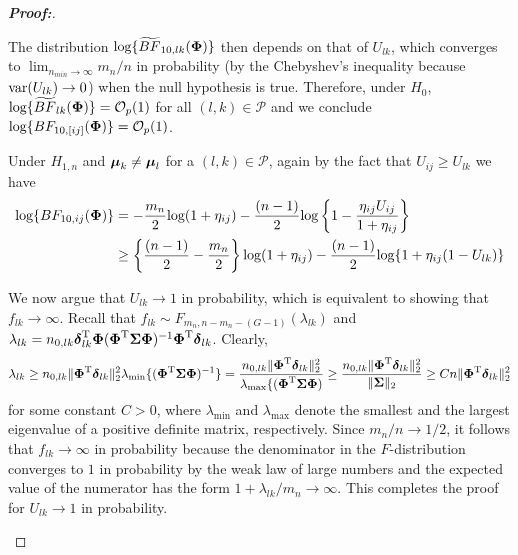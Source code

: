 \documentclass[pdflatex,sn-basic]{sn-jnl}%
\def\log{\hbox{log}}
\def\var{\hbox{var}}
\def\log{\hbox{log}}
\def\var{\hbox{var}}
\def\be{\begin{eqnarray}}
\def\ee{\end{eqnarray}}
\def\trans{^{\rm T}}
\newcommand{\bSigma}{\mbox{\boldmath $\Sigma$}}
\newcommand{\udelta}            {\mbox{\boldmath$\delta$}}
\newcommand{\umu}               {\mbox{\boldmath$\mu$}}
\newcommand{\uPhi}              {\mbox{\boldmath$\Phi$}}
\theoremstyle{thmstyleone}%
\theoremstyle{thmstyletwo}%
\theoremstyle{thmstylethree}%
\begin{document}
\begin{appendices}
\begin{proof}[\textbf{\upshape Proof:}]
\begin{description}
The distribution $ \log\{\widetilde{BF}_{10, lk}(\uPhi) \}$ then depends on that of $U_{lk}$, which
converges to $\lim_{n_{min}\to\infty}m_n/n$ in probability (by the Chebyshev's inequality because $\var(U_{lk})\to 0$)
when the null hypothesis is true.
Therefore, under $H_0$, $\log\{\widetilde{BF}_{lk}(\uPhi) \} = \mathcal{O}_{p}(1)$ for all $(l, k)\in\mathcal{P}$ and we conclude $\log\{BF_{10,[ij]}(\uPhi) \} = \mathcal{O}_{p}(1)$.

Under $H_{1,n}$ and $\umu_{k} \neq \umu_{l}$ for a $(l, k) \in \mathcal{P}$, again 
by the fact that $U_{ij}\geq U_{lk}$ 
we have
\begin{align*}
    \log\{BF_{10,ij}(\uPhi) \} &= -\frac{m_n}{2}\log(1 + \eta_{ij}) - \frac{(n-1)}{2}\log\left\{ 1 - \frac{\eta_{ij} U_{ij}}{1 + \eta_{ij}} \right\}\\
    & \geq \left\{\frac{(n - 1)}{2} - \frac{m_n}{2}\right\}\log(1 + \eta_{ij}) - \frac{(n - 1)}{2}\log\{1 + \eta_{ij}(1 - U_{lk})\}
\end{align*}
{\color{black}
We now argue that $U_{lk}\to 1$ in probability, which is equivalent to showing that $f_{lk}\to\infty$. Recall that $f_{lk}\sim F_{m_n, n - m_n - (G - 1)}(\lambda_{lk})$ and $\lambda_{lk} = n_{0,lk}\udelta_{lk}\trans\uPhi(\uPhi\trans\bSigma\uPhi)^{-1}\uPhi\trans\udelta_{lk}$. Clearly,
\[
\lambda_{lk} \geq n_{0,lk}\|\uPhi\trans\udelta_{lk}\|_2^2\lambda_{\min}\{(\uPhi\trans\bSigma\uPhi)^{-1}\}
= \frac{n_{0,lk}\|\uPhi\trans\udelta_{lk}\|_2^2}{\lambda_{\max}\{(\uPhi\trans\bSigma\uPhi)}\geq \frac{n_{0,lk}\|\uPhi\trans\udelta_{lk}\|_2^2}{\|\bSigma\|_2} \geq Cn\|\uPhi\trans\udelta_{lk}\|_2^2 
\]
for some constant $C > 0$, where $\lambda_{\min}$ and $\lambda_{\max}$ denote the smallest and the largest eigenvalue of a positive definite matrix, respectively. 
Since $m_n/n\to 1/2$, it follows that $f_{lk}\to \infty$ in probability because the denominator in the $F$-distribution converges to $1$ in probability by the weak law of large numbers and the expected value of the numerator has the form $1 + \lambda_{lk}/m_n\to\infty$. This completes the proof for $U_{lk}\to 1$ in probability. 

}
\end{description}
\end{proof}
\end{appendices}
\end{document}
